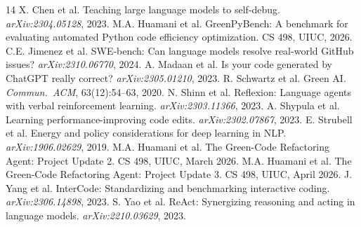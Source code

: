 \documentclass{article}
\begin{document}
\begin{thebibliography}{14}
 X. Chen et al. Teaching large language models to self-debug. \emph{arXiv:2304.05128}, 2023.
 M.A. Huamani et al. GreenPyBench: A benchmark for evaluating automated Python code efficiency optimization. CS 498, UIUC, 2026.
 C.E. Jimenez et al. SWE-bench: Can language models resolve real-world GitHub issues? \emph{arXiv:2310.06770}, 2024.
 A. Madaan et al. Is your code generated by ChatGPT really correct? \emph{arXiv:2305.01210}, 2023.
 R. Schwartz et al. Green AI. \emph{Commun.\ ACM}, 63(12):54--63, 2020.
 N. Shinn et al. Reflexion: Language agents with verbal reinforcement learning. \emph{arXiv:2303.11366}, 2023.
 A. Shypula et al. Learning performance-improving code edits. \emph{arXiv:2302.07867}, 2023.
 E. Strubell et al. Energy and policy considerations for deep learning in NLP. \emph{arXiv:1906.02629}, 2019.
 M.A. Huamani et al. The Green-Code Refactoring Agent: Project Update 2. CS 498, UIUC, March 2026.
 M.A. Huamani et al. The Green-Code Refactoring Agent: Project Update 3. CS 498, UIUC, April 2026.
 J. Yang et al. InterCode: Standardizing and benchmarking interactive coding. \emph{arXiv:2306.14898}, 2023.
 S. Yao et al. ReAct: Synergizing reasoning and acting in language models. \emph{arXiv:2210.03629}, 2023.
\end{thebibliography}
\end{document}
